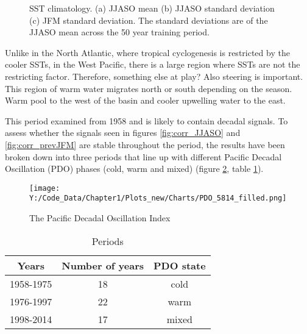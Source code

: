 \begin{figure} %
	
	\caption{SST climatology. (a) JJASO mean (b) JJASO standard deviation (c) JFM standard deviation. The standard deviations are of the JJASO mean across the 50 year training period.}\label{fig:SST_JJASO}
\end{figure}

Unlike in the North Atlantic, where tropical cyclogenesis is restricted by the cooler SSTs, in the West Pacific, there is a large region where SSTs are not the restricting factor. Therefore, something else at play? Also steering is important.
This region of warm water migrates north or south depending on the season. Warm pool to the west of the basin and cooler upwelling water to the east.

This period examined from 1958 and is likely to contain decadal signals. To assess whether the signals seen in figures \ref{fig:corr_JJASO} and \ref{fig:corr_prevJFM} are stable throughout the period, the results have been broken down into three periods that line up with different Pacific Decadal Oscillation (PDO) phases (cold, warm and mixed) (figure \ref{fig:PDO_time}, table \ref{tperiods}).



\begin{figure}
	\centering
	\noindent\texttt{[image: Y:/Code\_Data/Chapter1/Plots\_new/Charts/PDO\_5814\_filled.png]}
	\caption{The Pacific Decadal Oscillation Index}\label{fig:PDO_time}
\end{figure}

\begin{table}[h]
	\caption{Periods}\label{tperiods}
	\begin{center}
		\begin{tabular}{ccc}
			\hline\hline
			Years & Number of years & PDO state \\
			\hline
			1958-1975 & 18 & cold  \\ 
			1976-1997 & 22 & warm  \\ 
			1998-2014 & 17 & mixed  \\ 
			
			\hline
		\end{tabular}
	\end{center}
\end{table}


